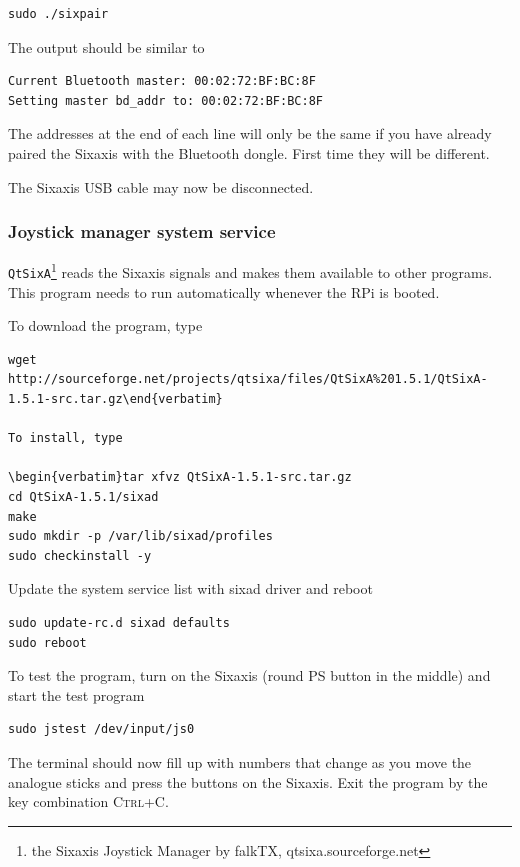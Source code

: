 \documentclass[a4paper,twoside,english]{report}
\newcommand{\noun}[1]{\textsc{#1}}
\begin{document}
\begin{verbatim}sudo ./sixpair\end{verbatim}

The output should be similar to

\begin{verbatim}Current Bluetooth master: 00:02:72:BF:BC:8F
Setting master bd_addr to: 00:02:72:BF:BC:8F\end{verbatim}

The addresses at the end of each line will only be the same if you
have already paired the Sixaxis with the Bluetooth dongle. First time
they will be different.

The Sixaxis USB cable may now be disconnected.

\subsubsection{Joystick manager system service}

\texttt{QtSixA}\footnote{the Sixaxis Joystick Manager by falkTX, qtsixa.sourceforge.net}
reads the Sixaxis signals and makes them available to other programs.
This program needs to run automatically whenever the RPi is booted.

To download the program, type

\begin{verbatim}wget http://sourceforge.net/projects/qtsixa/files/QtSixA%201.5.1/QtSixA-1.5.1-src.tar.gz\end{verbatim}

To install, type

\begin{verbatim}tar xfvz QtSixA-1.5.1-src.tar.gz
cd QtSixA-1.5.1/sixad
make
sudo mkdir -p /var/lib/sixad/profiles
sudo checkinstall -y\end{verbatim}

Update the system service list with sixad driver and reboot

\begin{verbatim}sudo update-rc.d sixad defaults
sudo reboot\end{verbatim}

To test the program, turn on the Sixaxis (round PS button in the middle)
and start the test program

\begin{verbatim}sudo jstest /dev/input/js0\end{verbatim}

The terminal should now fill up with numbers that change as you move
the analogue sticks and press the buttons on the Sixaxis. Exit the
program by the key combination \noun{Ctrl+C}.
\end{document}
